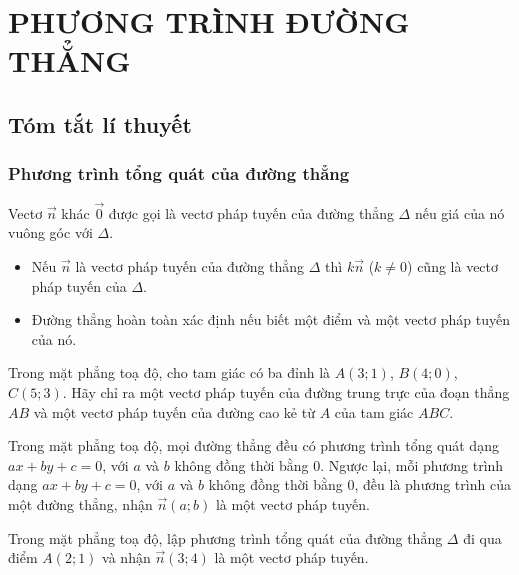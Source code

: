 \newpage\setcounter{dang}{0}
\section{PHƯƠNG TRÌNH ĐƯỜNG THẲNG}
\subsection{Tóm tắt lí thuyết}
\subsubsection{Phương trình tổng quát của đường thẳng}
\begin{dn}
	Vectơ $\vec{n}$ khác $\vec{0}$ được gọi là vectơ pháp tuyến của đường thẳng $\Delta$ nếu giá của nó vuông góc với $\Delta$.
\end{dn}
\begin{nx}
	\begin{itemize}
		\item Nếu $\vec{n}$ là vectơ pháp tuyến của đường thẳng $\Delta$ thì $k\vec{n}$ ($k \ne 0$) cũng là vectơ pháp tuyến của $\Delta$.
		\item Đường thẳng hoàn toàn xác định nếu biết một điểm và một vectơ pháp tuyến của nó.
	\end{itemize}
\end{nx}

\begin{vd}
	Trong mặt phẳng toạ độ, cho tam giác có ba đỉnh là $A(3;1)$, $B(4;0)$, $C(5;3)$. Hãy chỉ ra  một vectơ pháp tuyến của đường trung trực của đoạn thẳng $AB$ và một vectơ pháp tuyến của đường cao kẻ từ $A$ của tam giác $ABC$.
\end{vd}

\begin{nx}
	Trong mặt phẳng toạ độ, mọi đường thẳng đều có phương trình tổng quát dạng $ax+by+c=0$, với $a$ và  $b$ không đồng thời bằng $0$. Ngược lại, mỗi phương trình dạng $ax+by+c=0$,  với $a$ và  $b$ không đồng thời bằng $0$, đều là phương trình của một đường thẳng, nhận $\vec{n}(a;b)$ là một vectơ pháp tuyến.
\end{nx}
\begin{vd}
	Trong mặt phẳng toạ độ, lập phương trình tổng quát của đường thẳng $\Delta$ đi qua điểm $A(2;1)$ và nhận $\vec{n}(3;4)$ là một vectơ pháp tuyến.
\end{vd}

